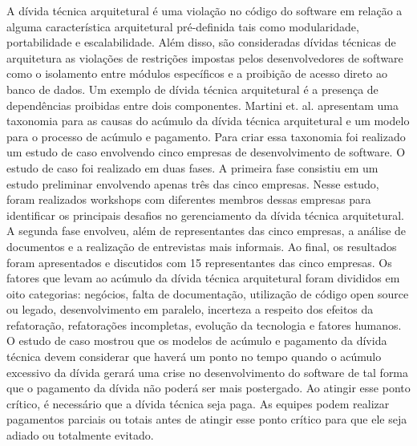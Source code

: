 A dívida técnica arquitetural é uma violação no código do software em relação a alguma característica arquitetural pré-definida tais como modularidade, portabilidade e escalabilidade. Além disso, são consideradas dívidas técnicas de arquitetura as violações de restrições impostas pelos desenvolvedores de software como o isolamento entre módulos específicos e  a proibição de acesso direto ao banco de dados.  Um exemplo de dívida técnica arquitetural é a presença de dependências proibidas entre  dois componentes. Martini et. al. \cite{martini2014architecture} apresentam uma taxonomia para as causas do acúmulo da dívida técnica arquitetural e um modelo para o processo de acúmulo e pagamento. Para criar essa taxonomia foi realizado um estudo de caso envolvendo cinco empresas de desenvolvimento de software.  O estudo de caso foi realizado em duas fases. A primeira fase consistiu em um estudo preliminar envolvendo apenas três das cinco empresas. Nesse estudo, foram realizados workshops com diferentes membros dessas empresas para identificar os principais desafios no gerenciamento da dívida técnica arquitetural. A segunda fase envolveu, além de representantes das cinco empresas, a análise de documentos e a realização de entrevistas mais informais. Ao final, os resultados foram apresentados e discutidos com 15 representantes das cinco empresas. Os fatores que levam ao acúmulo da dívida técnica arquitetural foram divididos em oito categorias: negócios, falta de documentação, utilização de código open source ou legado, desenvolvimento em paralelo, incerteza a respeito dos efeitos da refatoração, refatorações incompletas, evolução da tecnologia e fatores humanos. O estudo de caso mostrou que os modelos de acúmulo e pagamento da dívida técnica devem considerar que haverá um ponto no tempo quando o acúmulo excessivo da dívida gerará uma crise  no desenvolvimento do software de tal forma que o pagamento da dívida não poderá ser mais postergado. Ao atingir esse ponto crítico, é necessário que a dívida técnica seja paga. As equipes podem realizar pagamentos parciais ou totais antes de atingir esse ponto crítico para que ele seja adiado ou totalmente evitado. 





